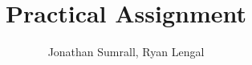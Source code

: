 \documentclass[]{apa}
\affiliation{1DV200}
\author{Jonathan Sumrall, Ryan Lengal}
\title{Practical Assignment}
\begin{document}
\maketitle{}
\end{document}
